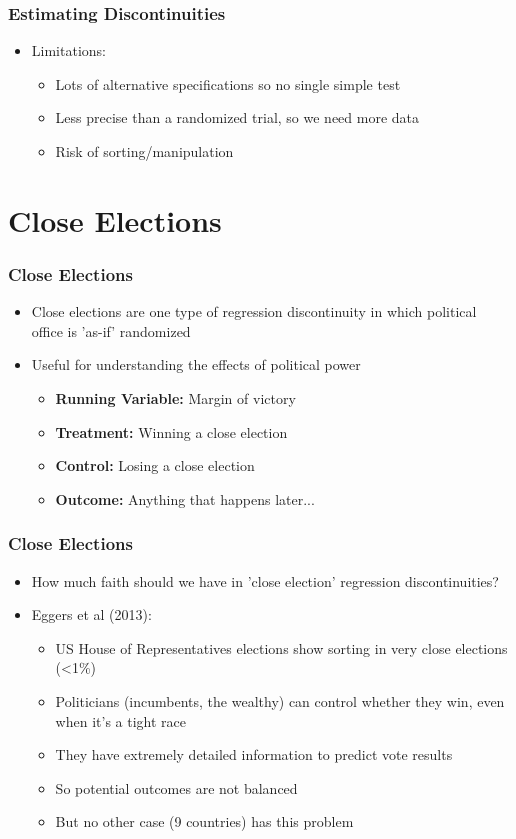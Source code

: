 \documentclass[xcolor=x11names,compress]{beamer}\usepackage[]{graphicx}\usepackage[]{color}
\renewcommand{\(}{\begin{columns}}
\renewcommand{\)}{\end{columns}}
\newcommand{\<}[1]{\begin{column}{#1}}
\renewcommand{\>}{\end{column}}
\begin{document}
\begin{frame}
\frametitle{Estimating Discontinuities}
\begin{itemize}
\item Limitations:
\begin{itemize}
\item Lots of alternative specifications so no single simple test
\pause
\item Less precise than a randomized trial, so we need more data
\pause
\item Risk of sorting/manipulation
\end{itemize}
\end{itemize}
\end{frame}

\section{Close Elections}

\begin{frame}
\frametitle{Close Elections}
\begin{itemize}
\item Close elections are one type of regression discontinuity in which political office is 'as-if' randomized
\pause
\item Useful for understanding the effects of political power
\pause
\begin{itemize}
\item \textbf{Running Variable: }Margin of victory
\item \textbf{Treatment: }Winning a close election
\item \textbf{Control: }Losing a close election
\item \textbf{Outcome: }Anything that happens later...
\end{itemize}
\end{itemize}
\end{frame}

\begin{frame}
\frametitle{Close Elections}
\begin{itemize}
\item How much faith should we have in 'close election' regression discontinuities?
\pause
\item Eggers et al (2013):
\pause
\begin{itemize}
\item US House of Representatives elections show sorting in very close elections (<1\%)
\pause
\item Politicians (incumbents, the wealthy) can control whether they win, even when it's a tight race
\pause
\item They have extremely detailed information to predict vote results
\pause
\item So potential outcomes are not balanced
\pause
\item But no other case (9 countries) has this problem
\end{itemize}
\end{itemize}
\end{frame}
\end{document}
